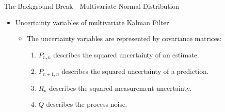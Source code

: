 \begin{frame}{The Background Break - Multivariate Normal Distribution}
\begin{itemize}
\item Uncertainty variables of multivariate Kalman Filter
    \begin{itemize}
        \item The uncertainty variables are represented by covariance matrices:
        \begin{enumerate}
            \item \(P_{n,n}\) describes the squared uncertainty of an estimate.
            \item \(P_{n+1,n}\) describes the squared uncertainty of a prediction.
            \item \(R_n\) describes the squared measurement uncertainty.
            \item \(Q\) describes the process noise.
        \end{enumerate}
    \end{itemize}
\end{itemize}    
\end{frame}
